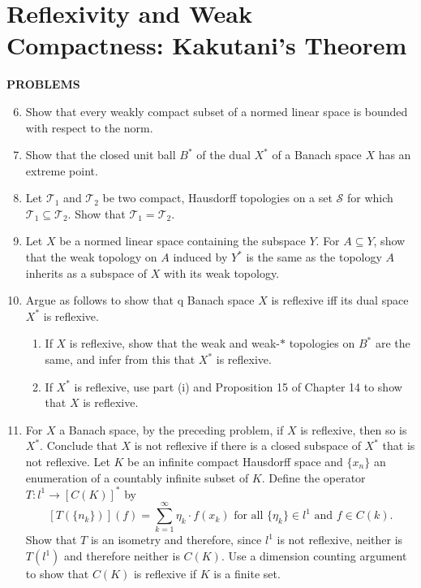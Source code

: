 \section{Reflexivity and Weak Compactness: Kakutani's Theorem}
\begin{center}
	\textbf{PROBLEMS}
\end{center}
\begin{enumerate}
	\setcounter{enumi}{5}
    \item Show that every weakly compact subset of a normed linear space is bounded with respect to the norm.
    \item Show that the closed unit ball $B^*$ of the dual $X^*$ of a Banach space $X$ has an extreme point.
    \item Let $\mathcal{T}_1$ and $\mathcal{T}_2$ be two compact, Hausdorff topologies on a set $\mathcal{S}$ for which $\mathcal{T}_1\subseteq\mathcal{T}_2$. Show that $\mathcal{T}_1=\mathcal{T}_2$.
    \item Let $X$ be a normed linear space containing the subspace $Y$. For $A\subseteq Y$, show that the weak topology on $A$ induced by $Y^*$ is the same as the topology $A$ inherits as a subspace of $X$ with its weak topology.
    \item Argue as follows to show that q Banach space $X$ is reflexive iff its dual space $X^*$ is reflexive.
    \begin{enumerate}[label=(\roman*),align=left]
        \item If $X$ is reflexive, show that the weak and weak-$*$ topologies on $B^*$ are the same, and infer from this that $X^*$ is reflexive.
        \item If $X^*$ is reflexive, use part (i) and Proposition 15 of Chapter 14 to show that $X$ is reflexive.
    \end{enumerate}
    \item For $X$ a Banach space, by the preceding problem, if $X$ is reflexive, then so is $X^*$. Conclude that $X$ is not reflexive if there is a closed subspace of $X^*$ that is not reflexive.
    Let $K$ be an infinite compact Hausdorff space and $\{x_n\}$ an enumeration of a countably infinite subset of $K$. Define the operator $T:l^1\to[C(K)]^*$ by
    \[
        [T(\{n_k\})](f)=\sum_{k=1}^\infty \eta_k\cdot f(x_k)\text{ for all }\{\eta_k\}\in l^1\text{ and }f\in C(k).
    \]
    Show that $T$ is an isometry and therefore, since $l^1$ is not reflexive, neither is $T(l^1)$ and therefore neither is $C(K)$. Use a dimension counting argument to show that $C(K)$ is reflexive if $K$ is a finite set.

\end{enumerate}
